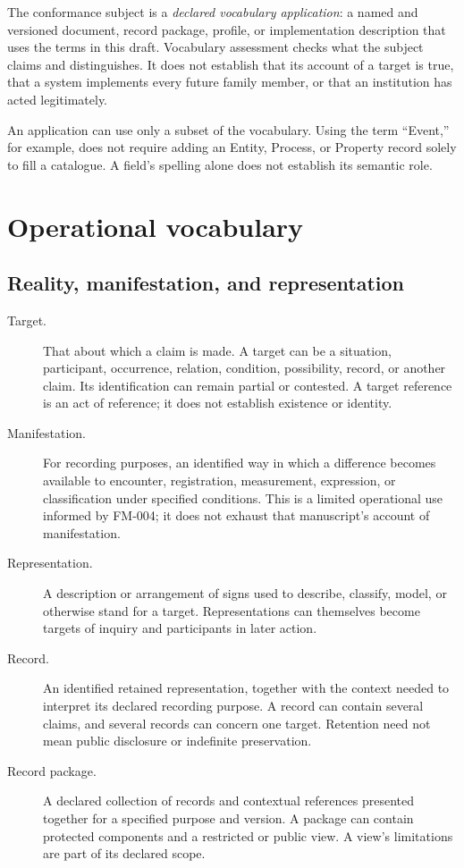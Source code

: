 \documentclass[11pt,a4paper]{article}
\begin{document}
The conformance subject is a \emph{declared vocabulary application}: a named and versioned document, record package, profile, or implementation description that uses the terms in this draft. Vocabulary assessment checks what the subject claims and distinguishes. It does not establish that its account of a target is true, that a system implements every future family member, or that an institution has acted legitimately.


An application can use only a subset of the vocabulary. Using the term ``Event,'' for example, does not require adding an Entity, Process, or Property record solely to fill a catalogue. A field's spelling alone does not establish its semantic role.

\section{Operational vocabulary}
\subsection{Reality, manifestation, and representation}
\begin{description}
\item[Target.] That about which a claim is made. A target can be a situation, participant, occurrence, relation, condition, possibility, record, or another claim. Its identification can remain partial or contested. A target reference is an act of reference; it does not establish existence or identity.
\item[Manifestation.] For recording purposes, an identified way in which a difference becomes available to encounter, registration, measurement, expression, or classification under specified conditions. This is a limited operational use informed by FM-004; it does not exhaust that manuscript's account of manifestation.
\item[Representation.] A description or arrangement of signs used to describe, classify, model, or otherwise stand for a target. Representations can themselves become targets of inquiry and participants in later action.
\item[Record.] An identified retained representation, together with the context needed to interpret its declared recording purpose. A record can contain several claims, and several records can concern one target. Retention need not mean public disclosure or indefinite preservation.
\item[Record package.] A declared collection of records and contextual references presented together for a specified purpose and version. A package can contain protected components and a restricted or public view. A view's limitations are part of its declared scope.
\end{description}
\end{document}
